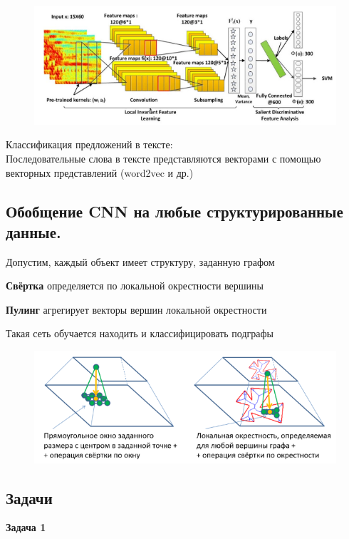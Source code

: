 \begin{description}
\begin{figure}[h]
\centering

\includegraphics[width=0.8\linewidth]{chapters/neural/images/pic.png}

\label{fig:mpr}

\end{figure}

Классификация предложений в тексте:\\
Последовательные слова в тексте представляются векторами с помощью векторных представлений (word2vec и др.)\\

\newpage
\subsection{Обобщение CNN на любые структурированные данные.}
Допустим, каждый объект имеет структуру, заданную графом

\textbf{Свёртка} определяется по локальной окрестности вершины

\textbf{Пулинг} агрегирует векторы вершин локальной окрестности

Такая сеть обучается находить и классифицировать подграфы

\begin{figure}[h]

\centering

\includegraphics[width=0.8\linewidth]{chapters/neural/images/обобщениеCNN.png}

\label{fig:mpr}

\end{figure}

\subsection{Задачи}
\textbf{Задача 1}


\end{description}
